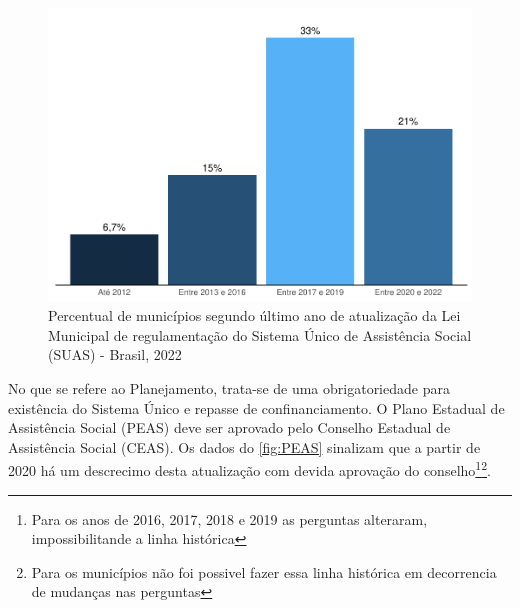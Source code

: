 \documentclass[
  brazilian]{report}
\begin{document}
\begin{figure}
\includegraphics{Censo-SUAS-2022_files/figure-latex/municipios-atualizacao-lei-1} \caption[Percentual de municípios segundo último ano de atualização da Lei Municipal de regulamentação do Sistema Único de Assistência Social (SUAS) - Brasil, 2022]{Percentual de municípios segundo último ano de atualização da Lei Municipal de regulamentação do Sistema Único de Assistência Social (SUAS) - Brasil, 2022}\label{fig:municipios-atualizacao-lei}
\end{figure}

No que se refere ao Planejamento, trata-se de uma obrigatoriedade para
existência do Sistema Único e repasse de confinanciamento. O Plano
Estadual de Assistência Social (PEAS) deve ser aprovado pelo Conselho
Estadual de Assistência Social (CEAS). Os dados do \cref{fig:PEAS}
sinalizam que a partir de 2020 há um descrecimo desta atualização com
devida aprovação do
conselho\footnote{Para os anos de 2016, 2017, 2018 e 2019 as perguntas alteraram, impossibilitande a linha histórica}\footnote{Para os municípios não foi possivel fazer essa linha histórica em decorrencia de mudanças nas perguntas}.
\end{document}
